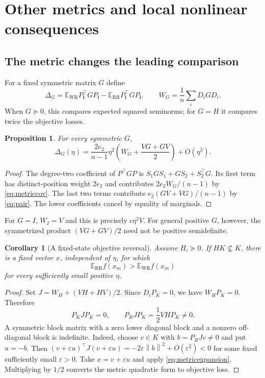\documentclass[11pt,letterpaper]{article}
\numberwithin{equation}{section}
\newtheorem{proposition}[theorem]{Proposition}
\newtheorem{corollary}[theorem]{Corollary}
\theoremstyle{definition}
\newcommand{\E}{\mathbb E}
\newcommand{\WR}{\mathrm{WR}}
\newcommand{\RR}{\mathrm{RR}}
\newcommand{\norm}[1]{\left\lVert #1\right\rVert}
\begin{document}
\section{Other metrics and local nonlinear consequences}
\label{sec:metrics}

\subsection{The metric changes the leading comparison}

For a fixed symmetric matrix $G$ define
\[
 \Delta_G=\E_{\WR}P_{\bm i}^\top GP_{\bm i}
          -\E_{\RR}P_{\bm i}^\top GP_{\bm i},
 \qquad W_G=\frac1n\sum_iD_iGD_i.
\]
When $G\succeq0$, this compares expected squared seminorms; for $G=H$ it compares twice the objective losses.

\begin{proposition}\label{prop:metric}
For every symmetric $G$,
\begin{equation}\label{eq:metricexpansion}
 \Delta_G(\eta)=\frac{2e_2}{n-1}\eta^2
 \left(W_G+\frac{VG+GV}{2}\right)+O(\eta^3).
\end{equation}
\end{proposition}
\begin{proof}
The degree-two coefficient of $P^\top GP$ is $S_1GS_1+GS_2+S_2^\top G$. Its first term has distinct-position weight $2e_2$ and contributes $2e_2W_G/(n-1)$ by \eqref{eq:metriccov}. The last two terms contribute $e_2(GV+VG)/(n-1)$ by \eqref{eq:pair}. The lower coefficients cancel by equality of marginals.
\end{proof}

For $G=I$, $W_I=V$ and this is precisely $c\eta^2V$. For general positive $G$, however, the symmetrized product $(VG+GV)/2$ need not be positive semidefinite.

\begin{corollary}[A fixed-state objective reversal]\label{cor:objective}
Assume $H_i\succeq0$. If $HK\not\subseteq K$, there is a fixed vector $x$, independent of $\eta$, for which
\[
 \E_{\RR}f(x_m)>\E_{\WR}f(x_m)
\]
for every sufficiently small positive $\eta$.
\end{corollary}
\begin{proof}
Set $J=W_H+(VH+HV)/2$. Since $D_iP_K=0$, we have $W_HP_K=0$. Therefore
\[
 P_KJP_K=0,\qquad P_RJP_K=\frac12VHP_K\ne0.
\]
A symmetric block matrix with a zero lower diagonal block and a nonzero off-diagonal block is indefinite. Indeed, choose $v\in K$ with $b=P_RJv\ne0$ and put $u=-b$. Then
$(v+\varepsilon u)^\top J(v+\varepsilon u)
=-2\varepsilon\norm b^2+O(\varepsilon^2)<0$
for some fixed sufficiently small $\varepsilon>0$. Take $x=v+\varepsilon u$ and apply \eqref{eq:metricexpansion}. Multiplying by $1/2$ converts the metric quadratic form to objective loss.
\end{proof}
\end{document}
